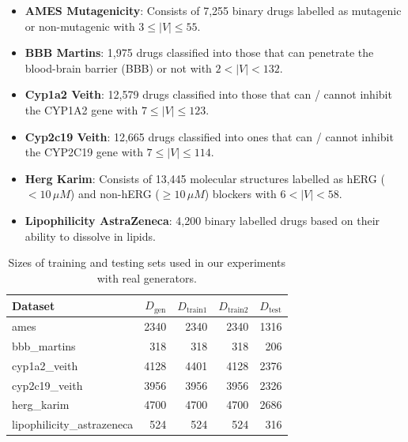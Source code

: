 \begin{itemize} 
    \item \textbf{AMES Mutagenicity}: Consists of 7,255 binary drugs labelled as mutagenic or non-mutagenic with $3 \leq |V| \leq 55$. 
    \item \textbf{BBB Martins}: 1,975 drugs classified into those that can penetrate the blood-brain barrier (BBB) or not with $2 < |V| < 132$. 
    \item \textbf{Cyp1a2 Veith}: 12,579 drugs classified into those that can / cannot inhibit the CYP1A2 gene with $7 \leq |V| \leq 123$. 
    \item \textbf{Cyp2c19 Veith}: 12,665 drugs classified into ones that can / cannot inhibit the CYP2C19 gene with $7 \leq |V| \leq 114$. 
    \item \textbf{Herg Karim}: Consists of 13,445 molecular structures labelled as hERG ($<10\,\mu M$) and non-hERG ($\geq 10\,\mu M$) blockers with $6 < |V| < 58$. 
    \item \textbf{Lipophilicity AstraZeneca}: 4,200 binary labelled drugs based on their ability to dissolve in lipids. 
\end{itemize}
\begin{table}[htbp]
    \centering
    \caption{Sizes of training and testing sets used in our experiments with real generators.}
    \begin{tabular}{|l|r|r|r|r|}
        \hline
        \textbf{Dataset} & \textbf{\(D_{\text{gen}}\)} & \textbf{\(D_{\text{train1}}\)} & \textbf{\(D_{\text{train2}}\)} & \textbf{\(D_{\text{test}}\)} \\
        \hline
        ames & 2340 & 2340 & 2340 & 1316 \\
        bbb\_martins & 318 & 318 & 318 & 206 \\
        cyp1a2\_veith & 4128 & 4401 & 4128 & 2376 \\
        cyp2c19\_veith & 3956 & 3956 & 3956 & 2326 \\
        herg\_karim & 4700 & 4700 & 4700 & 2686 \\
        lipophilicity\_astrazeneca & 524 & 524 & 524 & 316 \\
        \hline
    \end{tabular}
\end{table}
